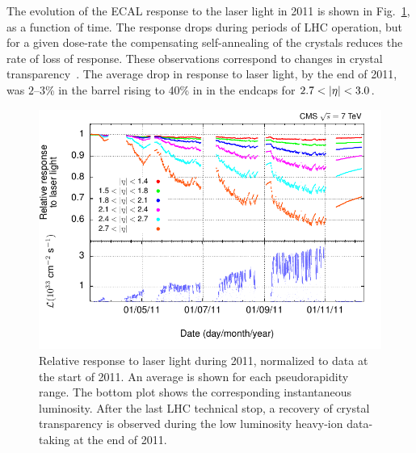 The evolution of the ECAL response to the laser light in 2011 is shown
in Fig.~\ref{fig:ECALLaserHistory}, as a function of time. 
The response drops during periods of LHC operation, but for a given dose-rate the compensating self-annealing
of the crystals reduces the rate of loss of response. These
observations correspond to changes in crystal transparency~\cite{Adzic:2009aa}. The average drop in response to
laser light, by the end of 2011, was $2–3$\% in the barrel rising to 40\% in
in the endcaps for $2.7< \lvert \eta \rvert< 3.0$.


\begin{figure}\centering
\includegraphics[width=.9\textwidth]{figs/cms/histories_2011_v2.pdf}
\caption{Relative response to laser light during 2011, normalized to
  data at the start of 2011. An average is shown for each
  pseudorapidity range. The bottom plot shows the corresponding
  instantaneous luminosity. After the last LHC technical stop, a
  recovery of crystal transparency is observed during the low
  luminosity heavy-ion data-taking at the end of
  2011.\label{fig:ECALLaserHistory}}
\end{figure}

